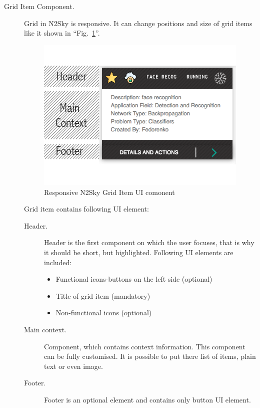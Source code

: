 \begin{description}
\item[Grid Item Component.] Grid in N2Sky is responsive. It can change positions and size of grid items like it shown in ``Fig.~\ref{fig:grid_item}''. 

\begin{figure}[htbp]
\begin{center}
  \includegraphics[scale=0.65]{components/3/components/grid_item.png}
  \caption{Responsive N2Sky Grid Item UI comonent}
  \label{fig:grid_item}
\end{center}
\end{figure}


Grid item contains following UI element: 
\begin{description}
\item[Header. ] Header is the first component on which the user focuses, that is why it should be short, but highlighted. Following UI elements are included: 
\begin{itemize}
\item Functional icons-buttons on the left side (optional)
\item Title of grid item (mandatory)
\item  Non-functional icons (optional)
\end{itemize}
\item[Main context. ] Component, which contains context information. This component can be fully customised. It is possible to put there list of items, plain text or even image.
 \item[Footer. ] Footer is an optional element and contains only button UI element. 
\end{description}


\end{description}
